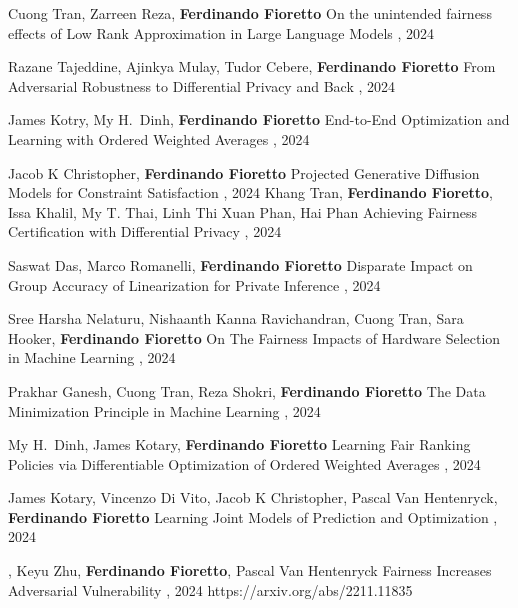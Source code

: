 \begin{pubs}

\wsentry
	{}
	{\student{} Cuong Tran, Zarreen Reza, {\bf Ferdinando Fioretto}}
  	{On the unintended fairness effects of Low Rank Approximation in Large Language Models}
	{\procACL, 2024}
	{}
	
\wsentry
	{}
	{\student{} Razane Tajeddine, Ajinkya Mulay, Tudor Cebere, {\bf Ferdinando Fioretto}}
  	{From Adversarial Robustness to Differential Privacy and Back}
	{\procUAI, 2024}
	{}

\wsentry
	{}
	{\student{} James Kotry, \student{} My H.~Dinh, {\bf Ferdinando Fioretto}}
  	{End-to-End Optimization and Learning with Ordered Weighted Averages}
	{\procUAI, 2024}
	{}

\wsentry
	{}
	{\student{} Jacob K Christopher, {\bf Ferdinando Fioretto}}
  	{Projected Generative Diffusion Models for Constraint Satisfaction}
	{\procICML, 2024}
	{}
\wsentry
	{}
	{Khang Tran, {\bf Ferdinando Fioretto}, Issa Khalil, My T. Thai, Linh Thi Xuan Phan, Hai Phan}
  	{Achieving Fairness Certification with Differential Privacy}
	{\procICML, 2024}
	{}

\wsentry
	{}
	{\student{} Saswat Das, Marco Romanelli, {\bf Ferdinando Fioretto}}
	{Disparate Impact on Group Accuracy of Linearization for Private Inference}
	{\procICML, 2024}
	{}

\wsentry
	{}
	{Sree Harsha Nelaturu, Nishaanth Kanna Ravichandran, \student{} Cuong Tran, Sara Hooker, {\bf Ferdinando Fioretto}}
	{On The Fairness Impacts of Hardware Selection in Machine Learning}
	{\procICML, 2024}
	{}

\wsentry
	{}
	{Prakhar Ganesh, \student{} Cuong Tran, Reza Shokri, {\bf Ferdinando Fioretto}}
	{The Data Minimization Principle in Machine Learning}
	{\procFAccT, 2024}
	{}

\wsentry
	{}
	{\student{} My H.~Dinh, \student{} James Kotary, {\bf Ferdinando Fioretto}}
	{Learning Fair Ranking Policies via Differentiable Optimization of Ordered Weighted Averages}
	{\procFAccT, 2024}
	{}

\wsentry
	{}
	{\student{} James Kotary, \student{} Vincenzo Di Vito, \student{} Jacob K Christopher, Pascal Van Hentenryck, {\bf Ferdinando Fioretto}}
	{Learning Joint Models of Prediction and Optimization}
	{\procIJCAI, 2024}
	{}

\wsentry
	{}
	{, Keyu Zhu, {\bf Ferdinando Fioretto}, Pascal Van Hentenryck}
	{Fairness Increases Adversarial Vulnerability}
	{\procIJCAI, 2024}
	{https://arxiv.org/abs/2211.11835}
\end{pubs}

